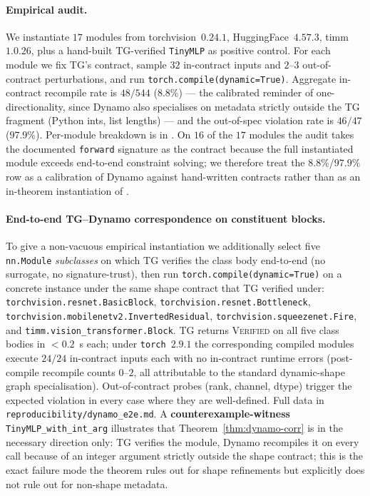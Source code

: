\paragraph{Empirical audit.}
We instantiate $17$ modules from torchvision~$0.24.1$,
HuggingFace~$4.57.3$, timm~$1.0.26$, plus a hand-built
\textsc{TG}-verified \texttt{TinyMLP} as positive control.
For each module we fix \textsc{TG}'s contract, sample $32$
in-contract inputs and $2$--$3$ out-of-contract perturbations,
and run \texttt{torch.compile(dynamic=True)}. Aggregate
in-contract recompile rate is $48/544$ ($8.8\%$) --- the
calibrated reminder of one-directionality, since Dynamo also
specialises on metadata strictly outside the \textsc{TG}
fragment (Python ints, list lengths) --- and the
out-of-spec violation rate is $46/47$ ($97.9\%$). Per-module
breakdown is in .  On $16$ of the $17$
modules the audit takes the documented \texttt{forward}
signature as the contract because the full instantiated module
exceeds end-to-end constraint solving; we therefore treat the
$8.8\%$/$97.9\%$ row as a calibration of Dynamo against
hand-written contracts rather than as an in-theorem
instantiation of .

\paragraph{End-to-end \textsc{TG}--Dynamo correspondence on
constituent blocks.}
To give  a non-vacuous empirical
instantiation we additionally select five \texttt{nn.Module}
\emph{subclasses} on which \textsc{TG} verifies the class body
end-to-end (no surrogate, no signature-trust), then run
\texttt{torch.compile(dynamic=True)} on a concrete instance
under the same shape contract that \textsc{TG} verified
under: \texttt{torchvision.resnet.BasicBlock},
\texttt{torchvision.resnet.Bottleneck},
\texttt{torchvision.mobilenetv2.InvertedResidual},
\texttt{torchvision.squeezenet.Fire}, and
\texttt{timm.vision\_transformer.Block}.  \textsc{TG} returns
\textsc{Verified} on all five class bodies in $<\!0.2$~s each;
under \texttt{torch}~$2.9.1$ the corresponding compiled modules
execute $24/24$ in-contract inputs each with no in-contract
runtime errors (post-compile recompile counts $0$--$2$, all
attributable to the standard dynamic-shape graph
specialisation).  Out-of-contract probes (rank, channel,
dtype) trigger the expected violation in every case where they
are well-defined.  Full data in
\texttt{reproducibility/dynamo\_e2e.md}.
A \textbf{counterexample-witness} \texttt{TinyMLP\_with\_int\_arg}
illustrates that Theorem~\ref{thm:dynamo-corr} is in the
necessary direction only: TG verifies the module, Dynamo
recompiles it on every call because of an integer argument
strictly outside the shape contract; this is the exact failure
mode the theorem rules out for shape refinements but explicitly
does not rule out for non-shape metadata.

